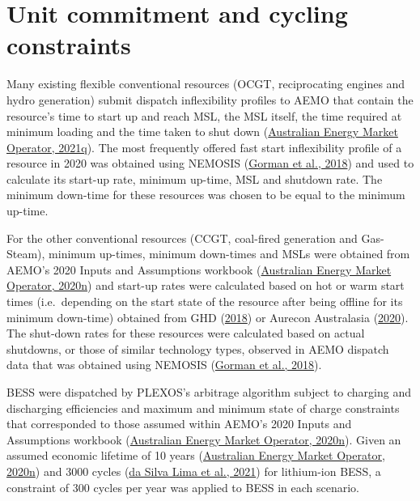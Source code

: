 \documentclass[12pt,a4paper,]{report}
\begin{document}
\hypertarget{unit-commitment-and-cycling-constraints}{%
\section{Unit commitment and cycling
constraints}\label{unit-commitment-and-cycling-constraints}}

Many existing flexible conventional resources (OCGT, reciprocating
engines and hydro generation) submit dispatch inflexibility profiles to
AEMO that contain the resource's time to start up and reach MSL, the MSL
itself, the time required at minimum loading and the time taken to shut
down
(\protect\hyperlink{ref-australianenergymarketoperatorFastStartInflexibilityProfile2021}{Australian
Energy Market Operator, 2021q}). The most frequently offered fast start
inflexibility profile of a resource in 2020 was obtained using NEMOSIS
(\protect\hyperlink{ref-gormanNEMOSISNEMOpen2018}{Gorman et al., 2018})
and used to calculate its start-up rate, minimum up-time, MSL and
shutdown rate. The minimum down-time for these resources was chosen to
be equal to the minimum up-time.

For the other conventional resources (CCGT, coal-fired generation and
Gas-Steam), minimum up-times, minimum down-times and MSLs were obtained
from AEMO's 2020 Inputs and Assumptions workbook
(\protect\hyperlink{ref-australianenergymarketoperator2020InputsAssumptions2020}{Australian
Energy Market Operator, 2020n}) and start-up rates were calculated based
on hot or warm start times (i.e.~depending on the start state of the
resource after being offline for its minimum down-time) obtained from
GHD (\protect\hyperlink{ref-ghd2018AEMOCost2018}{2018}) or Aurecon
Australasia
(\protect\hyperlink{ref-aureconaustralasiaGeneratorTechnicalCost2020}{2020}).
The shut-down rates for these resources were calculated based on actual
shutdowns, or those of similar technology types, observed in AEMO
dispatch data that was obtained using NEMOSIS
(\protect\hyperlink{ref-gormanNEMOSISNEMOpen2018}{Gorman et al., 2018}).

BESS were dispatched by PLEXOS's arbitrage algorithm subject to charging
and discharging efficiencies and maximum and minimum state of charge
constraints that corresponded to those assumed within AEMO's 2020 Inputs
and Assumptions workbook
(\protect\hyperlink{ref-australianenergymarketoperator2020InputsAssumptions2020}{Australian
Energy Market Operator, 2020n}). Given an assumed economic lifetime of
10 years
(\protect\hyperlink{ref-australianenergymarketoperator2020InputsAssumptions2020}{Australian
Energy Market Operator, 2020n}) and 3000 cycles
(\protect\hyperlink{ref-dasilvalimaLifeCycleAssessment2021}{da Silva
Lima et al., 2021}) for lithium-ion BESS, a constraint of 300 cycles per
year was applied to BESS in each scenario.
\end{document}
